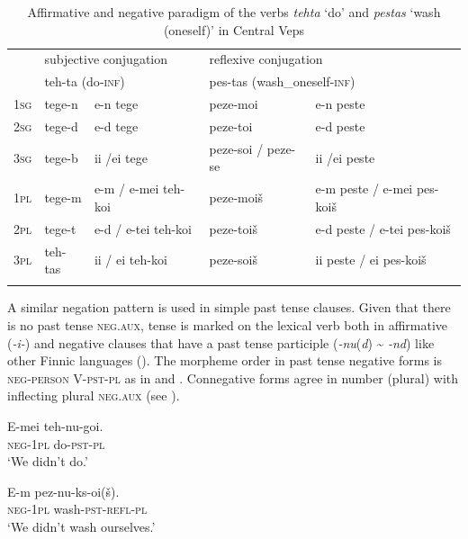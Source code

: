\documentclass[output=paper,colorlinks=true, citecolor=brown]{langscibook}
\begin{document}
\begin{table}
\centering\small 
\begin{tabularx}{\textwidth}{lllll}
\lsptoprule
 & \multicolumn{2}{l}{subjective conjugation}  &  \multicolumn{2}{l}{reflexive conjugation}    \\
& \multicolumn{2}{l}{teh-ta (do\textsc{{}-inf})}  & \multicolumn{2}{l}{pes-tas (wash\_oneself\textsc{{}-inf})}   \\
\midrule 
\textsc{1sg} & tege-n & e-n tege & peze-moi & {e-n peste}\\
\textsc{2sg} & tege-d & e-d tege & peze-toi & {e-d peste}\\
\textsc{3sg} & tege-b & ii /ei tege & peze-soi / peze-se & {ii /ei peste}\\
\textsc{1pl} & tege-m & e-m / e-mei teh-koi & peze-moiš & {e-m peste / e-mei pes-koiš} \\
\textsc{2pl} & tege-t & e-d / e-tei teh-koi & peze-toiš & {e-d peste / e-tei pes-koiš} \\
\textsc{3pl} & teh-tas & ii / ei teh-koi & peze-soiš & {ii peste / ei pes{}-koiš} \\
\lspbottomrule
\end{tabularx}
    \caption{Affirmative and negative paradigm of the verbs \textit{tehta} ‘do’ and \textit{pestas} ‘wash (oneself)’ in Central Veps \citep[254, 267--268]{Zaitseva2001}}
    \label{tab:vep:1}
\end{table}

A similar negation pattern is used in simple past tense clauses. Given that there is no past tense \textsc{neg}.\textsc{aux}, tense is marked on the lexical verb both in affirmative \mbox{(\textit{{}-i-}}) and negative clauses that have a past tense participle (\textit{{}-nu}(\textit{d}) {\textasciitilde} \textit{{}-nd}) like other Finnic languages (). The morpheme order in past tense negative forms is \textsc{neg-person} V{}-\textsc{pst}{}-\textsc{pl} as in  and .
Connegative forms agree in number (plural) with inflecting plural \textsc{neg}.\textsc{aux} (see ).

\ea\label{ex:vep:8additional}
    \gll E-mei teh-nu-goi.  \\
        \textsc{neg{}-1pl} do-\textsc{pst}{}-\textsc{pl}\\
    \glt ‘We didn’t do.’ \\
\z 

\ea\label{ex:vep:9additional}
    \gll E-m pez-nu-ks-oi(š).\\
        \textsc{neg{}-1pl} wash-\textsc{pst-refl}{}-\textsc{pl}\\
    \glt ‘We didn’t wash ourselves.’\\
\z 
\end{document}
